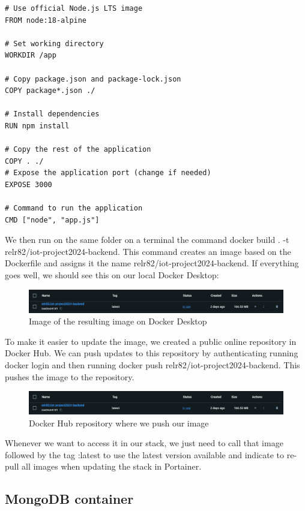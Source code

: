 \begin{lstlisting}
# Use official Node.js LTS image
FROM node:18-alpine

# Set working directory
WORKDIR /app

# Copy package.json and package-lock.json
COPY package*.json ./

# Install dependencies
RUN npm install

# Copy the rest of the application
COPY . ./
# Expose the application port (change if needed)
EXPOSE 3000

# Command to run the application
CMD ["node", "app.js"]
\end{lstlisting}

We then run on the same folder on a terminal the command docker build . -t relr82/iot-project2024-backend. This command creates an image based on the Dockerfile and assigns it the name relr82/iot-project2024-backend. If everything goes well, we should see this on our local Docker Desktop:
\begin{figure}[H]
    \centering
    \includegraphics[width=1\linewidth]{Hauptkapitel/Pictures/dockerdesktop.png}
    \caption{Image of the resulting image on Docker Desktop}
    \label{fig:enter-label}
\end{figure}

To make it easier to update the image, we created a public online repository in Docker Hub. We can push updates to this repository by authenticating running docker login and then running docker push relr82/iot-project2024-backend. This pushes the image to the repository.

\begin{figure}[H]
    \centering
    \includegraphics[width=0.5\linewidth]{Hauptkapitel/Pictures/dockerdesktop.png}
    \caption{Docker Hub repository where we push our image}
    \label{fig:enter-label}
\end{figure}

Whenever we want to access it in our stack, we just need to call that image followed by the tag :latest to use the latest version available and indicate to re-pull all images when updating the stack in Portainer.

\subsection{MongoDB container}

